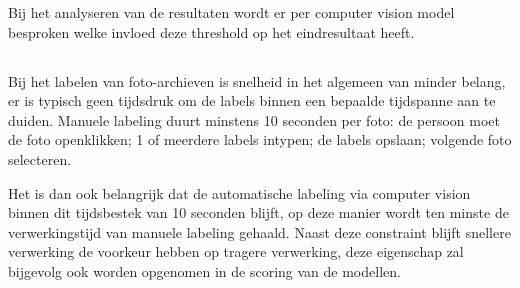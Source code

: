 Bij het analyseren van de resultaten wordt er per computer vision model besproken welke invloed deze threshold op het eindresultaat heeft. 

\subsection{}
\label{sec:scoren-of-speed}
Bij het labelen van foto-archieven is snelheid in het algemeen van minder belang, er is typisch geen tijdsdruk om de labels binnen een bepaalde tijdspanne aan te duiden. Manuele labeling duurt minstens 10 seconden per foto: de persoon moet de foto openklikken; 1 of meerdere labels intypen; de labels opslaan; volgende foto selecteren. 

Het is dan ook belangrijk dat de automatische labeling via computer vision binnen dit tijdsbestek van 10 seconden blijft, op deze manier wordt ten minste de verwerkingstijd van manuele labeling gehaald. Naast deze constraint blijft snellere verwerking de voorkeur hebben op tragere verwerking, deze eigenschap zal bijgevolg ook worden opgenomen in de scoring van de modellen.
